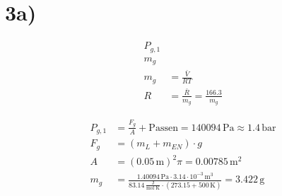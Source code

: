 

\section*{3a)}

\begin{align*}
P_{g,1} & \\
m_g & \\
m_g & = \frac{\bar{V}}{R T} \\
R & = \frac{\bar{R}}{m_g} = \frac{166.3}{m_g}
\end{align*}

\begin{align*}
P_{g,1} & = \frac{F_g}{A} + \text{Passen} = 140094 \, \text{Pa} \approx 1.4 \, \text{bar} \\
F_g & = (m_L + m_{EN}) \cdot g \\
A & = (0.05 \, \text{m})^2 \pi = 0.00785 \, \text{m}^2 \\
m_g & = \frac{1.40094 \, \text{Pa} \cdot 3.14 \cdot 10^{-3} \, \text{m}^3}{83.14 \, \frac{\text{J}}{\text{mol K}} \cdot (273.15 + 500 \, \text{K})} = 3.422 \, \text{g}
\end{align*}